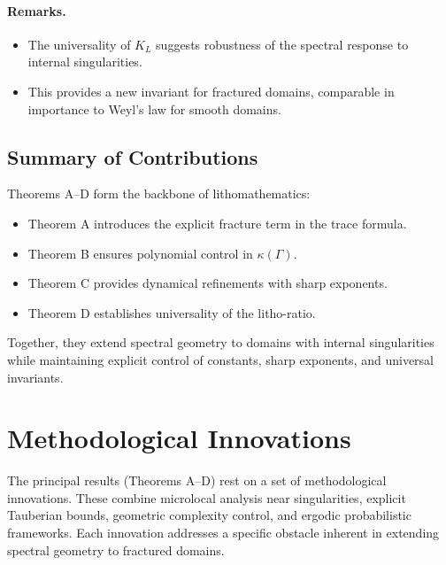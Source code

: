 \paragraph{Remarks.}
\begin{itemize}
  \item The universality of $K_L$ suggests robustness of the spectral response
  to internal singularities.
  \item This provides a new invariant for fractured domains, comparable in
  importance to Weyl's law for smooth domains.
\end{itemize}

\subsection{Summary of Contributions}

Theorems A--D form the backbone of lithomathematics:

\begin{itemize}
  \item Theorem A introduces the explicit fracture term in the trace formula.
  \item Theorem B ensures polynomial control in $\kappa(\Gamma)$.
  \item Theorem C provides dynamical refinements with sharp exponents.
  \item Theorem D establishes universality of the litho-ratio.
\end{itemize}

Together, they extend spectral geometry to domains with internal singularities
while maintaining explicit control of constants, sharp exponents, and universal
invariants.


\section{Methodological Innovations}

The principal results (Theorems A--D) rest on a set of methodological
innovations. These combine microlocal analysis near singularities, explicit
Tauberian bounds, geometric complexity control, and ergodic probabilistic
frameworks. Each innovation addresses a specific obstacle inherent in extending
spectral geometry to fractured domains.

